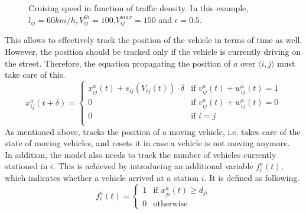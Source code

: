 \begin{figure}[t]
	\centering
	\caption[Cruising speed in function of traffic density]{Cruising speed in function of traffic density. In this example, $l_{ij} = 60 km/h,V_{ij}^{th} = 100$,$V_{ij}^{max} = 150$ and $\epsilon = 0.5$.  }
	\label{fig:speed_model}
\end{figure}
This allows to effectively track the position of the vehicle in terms of time as well. However, the position should be tracked only if the vehicle is currently driving on the street. Therefore, the equation propagating the position of $a$ over $\langle i,j\rangle$ must take care of this.
\begin{equation}
	x^a_{ij}(t+\delta) =\begin{cases}
		 x^a_{ij}(t) + s_{ij}(V_{ij}(t))\cdot\delta & \text{if } v^a_{ij}(t) + w^a_{ij}(t)= 1 \\
		 
		 0& \text{if } v^a_{ij}(t) + w^a_{ij}(t)= 0\\
		 0& \text{if }i=j \\
	\end{cases}
	 \label{eq:position_propagation}
\end{equation}
As mentioned above,  tracks the position of a moving vehicle, i.e. takes care of the state of moving vehicles, and resets it in case a vehicle is not moving anymore.\\
 In addition, the model also needs to track the number of vehicles currently stationed in $i$. This is achieved by introducing an additional variable $f^a_i(t)$, which indicates whether a vehicle arrived at a station $i$. It is defined as following.
\begin{equation}
	f^a_{i}(t) =\begin{cases}
		1 & \text{if }x^a_{ji}(t) \ge d_{ji}\\
		0 & \text{otherwise}
	\end{cases}
	\label{eq:station_propagation}
\end{equation}
